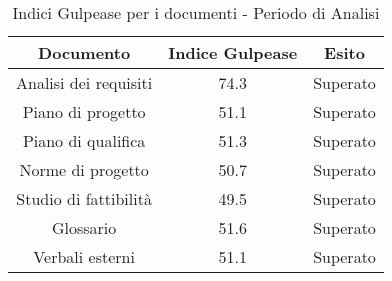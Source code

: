       
      \begin{table}[H]
        \centering
        \begin{tabular}{|c|c|c|}
          \hline
          \textbf{Documento} & \textbf{Indice Gulpease} & \textbf{Esito}\\
          \hline
          Analisi dei requisiti & 74.3  & Superato \\
          Piano di progetto & 51.1  & Superato \\
          Piano di qualifica  & 51.3  & Superato \\
          Norme di progetto & 50.7  & Superato \\
          Studio di fattibilità & 49.5  & Superato \\
          Glossario & 51.6  & Superato  \\
          Verbali esterni & 51.1  & Superato \\
          \hline
        \end{tabular}
        \caption{Indici Gulpease per i documenti - Periodo di Analisi}
      \end{table}

